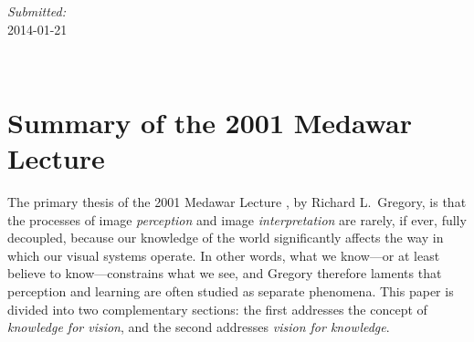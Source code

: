 \documentclass[12pt]{article} %
\begin{document}
\begin{titlepage}

\begin{minipage}{0.4\textwidth}
\begin{center} \large
\emph{Submitted:} \\
2014-01-21 %
\end{center}
\end{minipage}\\[4cm]

\vfill %
\end{titlepage}


\fontsize{12}{16}%
\selectfont

\section*{Summary of the 2001 Medawar Lecture}
The primary thesis of the 2001 Medawar Lecture \cite{gregory2005}, by Richard L.\ Gregory, is that the processes of image \textit{perception} and image \textit{interpretation} are rarely, if ever, fully decoupled, because our knowledge of the world significantly affects the way in which our visual systems operate. In other words, what we know---or at least believe to know---constrains what we see, and Gregory therefore laments that perception and learning are often studied as separate phenomena. This paper is divided into two complementary sections: the first addresses the concept of \textit{knowledge for vision}, and the second addresses \textit{vision for knowledge}. 
\end{document}
